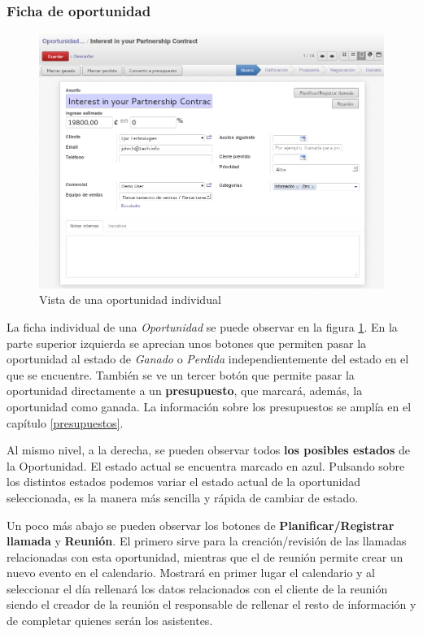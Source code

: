 \vspace{2cm}
\subsubsection{Ficha de oportunidad}

\begin{figure}[H]
\includegraphics[width=\textwidth]{ventas/img/ven_opoindividual.png}
\caption{Vista de una oportunidad individual}
\label{ven:opoindividual}
\end{figure}

La ficha individual de una \emph{Oportunidad} se puede observar en la figura \ref{ven:opoindividual}. En la parte superior izquierda se 
aprecian unos botones que permiten pasar la oportunidad al estado de \emph{Ganado} o \emph{Perdida} independientemente del estado en el que se encuentre. También se ve un tercer botón que permite pasar la oportunidad directamente a un \textbf{presupuesto}, que marcará, además, la oportunidad como ganada. La información sobre los presupuestos se amplía en el capítulo \ref{presupuestos}.

Al mismo nivel, a la derecha, se pueden observar todos \textbf{los posibles estados} de la Oportunidad. El estado actual se encuentra
marcado en azul. Pulsando sobre los distintos estados podemos variar el estado actual de la oportunidad seleccionada, es la manera 
más sencilla y rápida de cambiar de estado.

Un poco más abajo se pueden observar los botones de \textbf{Planificar/Registrar llamada} y \textbf{Reunión}. El primero sirve para la creación/revisión de las llamadas relacionadas con esta oportunidad, mientras que el de reunión permite crear un nuevo evento en el calendario. Mostrará en primer lugar el calendario y al seleccionar el día rellenará los datos relacionados con el cliente de la reunión
siendo el creador de la reunión el responsable de rellenar el resto de información y de completar quienes serán los asistentes.

